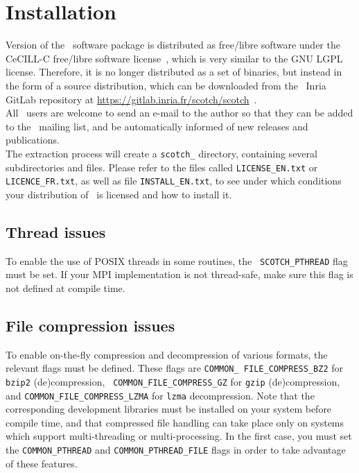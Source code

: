 
\section{Installation}
\label{sec-install}

Version {\sc \scotchver} of the \scotch\ software package is
distributed as free/libre software under the CeCILL-C free/libre
software license~\cite{cecill}, which is very similar to the GNU LGPL
license. Therefore, it is no longer distributed as a set of binaries,
but instead in the form of a source distribution, which can be
downloaded from the \scotch\ Inria GitLab repository at
\url{https://gitlab.inria.fr/scotch/scotch}~.
\\

All \scotch\ users are welcome to send an e-mail to the author so that
they can be added to the \scotch\ mailing list, and be automatically
informed of new releases and publications.
\\

The extraction process will create a {\tt scotch\_\scotchversub}
directory, containing several subdirectories and files. Please refer
to the files called {\tt LICENSE\_\lbt EN.txt} or
{\tt LICENCE\_\lbt FR.txt}, as well as file
{\tt INSTALL\_\lbt EN.txt}, to see under which conditions your
distribution of \scotch\ is licensed and how to install it.

\subsection{Thread issues}

To enable the use of POSIX threads in some routines, the {\tt
SCOTCH\_\lbt PTHREAD} flag must be set. If your MPI implementation is
not thread-safe, make sure this flag is not defined at compile time.

\subsection{File compression issues}

To enable on-the-fly compression and decompression of various formats,
the relevant flags must be defined. These flags are {\tt COMMON\_\lbt
FILE\_\lbt COMPRESS\_\lbt BZ2} for {\tt bzip2} (de)compression, {\tt
COMMON\_\lbt FILE\_\lbt COMPRESS\_\lbt GZ} for {\tt gzip}
(de)compression, and {\tt COMMON\_\lbt FILE\_\lbt COMPRESS\_\lbt LZMA}
for {\tt lzma} decompression. Note that the corresponding
development libraries must be installed on your system before compile
time, and that compressed file handling can take place only on systems
which support multi-threading or multi-processing. In the first case,
you must set the {\tt COMMON\_\lbt PTHREAD} and
{\tt COMMON\_\lbt PTHREAD\_\lbt FILE} flags in order to take advantage
of these features.

